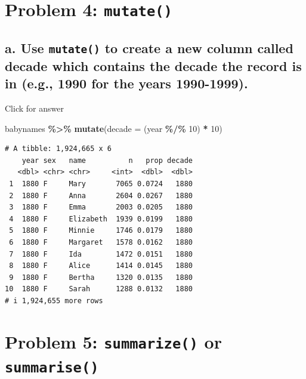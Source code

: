 \documentclass[
]{book}
\newenvironment{Shaded}{\begin{snugshade}}{\end{snugshade}}
\newcommand{\AttributeTok}[1]{\textcolor[rgb]{0.13,0.29,0.53}{#1}}
\newcommand{\DecValTok}[1]{\textcolor[rgb]{0.00,0.00,0.81}{#1}}
\newcommand{\FunctionTok}[1]{\textcolor[rgb]{0.13,0.29,0.53}{\textbf{#1}}}
\newcommand{\NormalTok}[1]{#1}
\newcommand{\SpecialCharTok}[1]{\textcolor[rgb]{0.81,0.36,0.00}{\textbf{#1}}}
\begin{document}
\hypertarget{problem-4-mutate}{%
\section{\texorpdfstring{Problem 4: \texttt{mutate()}}{Problem 4: mutate()}}\label{problem-4-mutate}}

\hypertarget{a.-use-mutate-to-create-a-new-column-called-decade-which-contains-the-decade-the-record-is-in-e.g.-1990-for-the-years-1990-1999.}{%
\subsection{\texorpdfstring{a. Use \texttt{mutate()} to create a new column called decade which contains the decade the record is in (e.g., 1990 for the years 1990-1999).}{a. Use mutate() to create a new column called decade which contains the decade the record is in (e.g., 1990 for the years 1990-1999).}}\label{a.-use-mutate-to-create-a-new-column-called-decade-which-contains-the-decade-the-record-is-in-e.g.-1990-for-the-years-1990-1999.}}

Click for answer

\begin{Shaded}
\begin{Highlighting}[]
\NormalTok{babynames }\SpecialCharTok{\%\textgreater{}\%} \FunctionTok{mutate}\NormalTok{(}\AttributeTok{decade =}\NormalTok{ (year }\SpecialCharTok{\%/\%} \DecValTok{10}\NormalTok{) }\SpecialCharTok{*} \DecValTok{10}\NormalTok{)}
\end{Highlighting}
\end{Shaded}

\begin{verbatim}
# A tibble: 1,924,665 x 6
    year sex   name          n   prop decade
   <dbl> <chr> <chr>     <int>  <dbl>  <dbl>
 1  1880 F     Mary       7065 0.0724   1880
 2  1880 F     Anna       2604 0.0267   1880
 3  1880 F     Emma       2003 0.0205   1880
 4  1880 F     Elizabeth  1939 0.0199   1880
 5  1880 F     Minnie     1746 0.0179   1880
 6  1880 F     Margaret   1578 0.0162   1880
 7  1880 F     Ida        1472 0.0151   1880
 8  1880 F     Alice      1414 0.0145   1880
 9  1880 F     Bertha     1320 0.0135   1880
10  1880 F     Sarah      1288 0.0132   1880
# i 1,924,655 more rows
\end{verbatim}

\hypertarget{problem-5-summarize-or-summarise}{%
\section{\texorpdfstring{Problem 5: \texttt{summarize()} or \texttt{summarise()}}{Problem 5: summarize() or summarise()}}\label{problem-5-summarize-or-summarise}}
\end{document}
